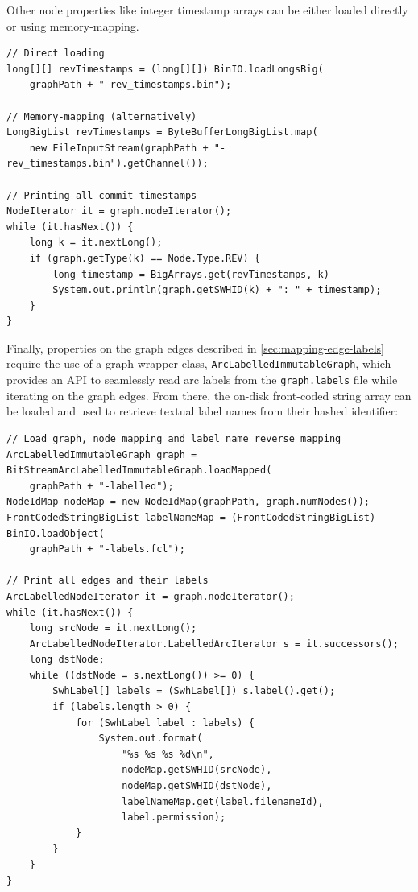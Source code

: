 Other node properties like integer timestamp arrays can be either loaded
directly or using memory-mapping.

\begin{verbatim}
// Direct loading
long[][] revTimestamps = (long[][]) BinIO.loadLongsBig(
    graphPath + "-rev_timestamps.bin");

// Memory-mapping (alternatively)
LongBigList revTimestamps = ByteBufferLongBigList.map(
    new FileInputStream(graphPath + "-rev_timestamps.bin").getChannel());

// Printing all commit timestamps
NodeIterator it = graph.nodeIterator();
while (it.hasNext()) {
    long k = it.nextLong();
    if (graph.getType(k) == Node.Type.REV) {
        long timestamp = BigArrays.get(revTimestamps, k)
        System.out.println(graph.getSWHID(k) + ": " + timestamp);
    }
}
\end{verbatim}

Finally, properties on the graph edges described in
\cref{sec:mapping-edge-labels} require the use of a graph wrapper class,
\texttt{ArcLabelledImmutableGraph}, which provides an API to seamlessly read
arc labels from the \texttt{graph.labels} file while iterating on the graph
edges. From there, the on-disk front-coded string array can be loaded and used
to retrieve textual label names from their hashed identifier:

\begin{verbatim}
// Load graph, node mapping and label name reverse mapping
ArcLabelledImmutableGraph graph = BitStreamArcLabelledImmutableGraph.loadMapped(
    graphPath + "-labelled");
NodeIdMap nodeMap = new NodeIdMap(graphPath, graph.numNodes());
FrontCodedStringBigList labelNameMap = (FrontCodedStringBigList) BinIO.loadObject(
    graphPath + "-labels.fcl");

// Print all edges and their labels
ArcLabelledNodeIterator it = graph.nodeIterator();
while (it.hasNext()) {
    long srcNode = it.nextLong();
    ArcLabelledNodeIterator.LabelledArcIterator s = it.successors();
    long dstNode;
    while ((dstNode = s.nextLong()) >= 0) {
        SwhLabel[] labels = (SwhLabel[]) s.label().get();
        if (labels.length > 0) {
            for (SwhLabel label : labels) {
                System.out.format(
                    "%s %s %s %d\n",
                    nodeMap.getSWHID(srcNode),
                    nodeMap.getSWHID(dstNode),
                    labelNameMap.get(label.filenameId),
                    label.permission);
            }
        }
    }
}
\end{verbatim}
